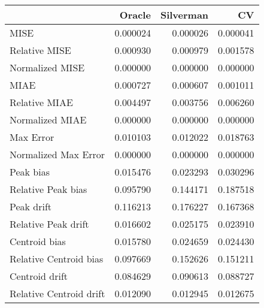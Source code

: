 \begin{tabular}{lrrr}
  \hline
 & Oracle & Silverman & CV \\ 
  \hline
MISE & 0.000024 & 0.000026 & 0.000041 \\ 
  Relative MISE & 0.000930 & 0.000979 & 0.001578 \\ 
  Normalized MISE & 0.000000 & 0.000000 & 0.000000 \\ 
  MIAE & 0.000727 & 0.000607 & 0.001011 \\ 
  Relative MIAE & 0.004497 & 0.003756 & 0.006260 \\ 
  Normalized MIAE & 0.000000 & 0.000000 & 0.000000 \\ 
  Max Error & 0.010103 & 0.012022 & 0.018763 \\ 
  Normalized Max Error & 0.000000 & 0.000000 & 0.000000 \\ 
  Peak bias & 0.015476 & 0.023293 & 0.030296 \\ 
  Relative Peak bias & 0.095790 & 0.144171 & 0.187518 \\ 
  Peak drift & 0.116213 & 0.176227 & 0.167368 \\ 
  Relative Peak drift & 0.016602 & 0.025175 & 0.023910 \\ 
  Centroid bias & 0.015780 & 0.024659 & 0.024430 \\ 
  Relative Centroid bias & 0.097669 & 0.152626 & 0.151211 \\ 
  Centroid drift & 0.084629 & 0.090613 & 0.088727 \\ 
  Relative Centroid drift & 0.012090 & 0.012945 & 0.012675 \\ 
   \hline
\end{tabular}
